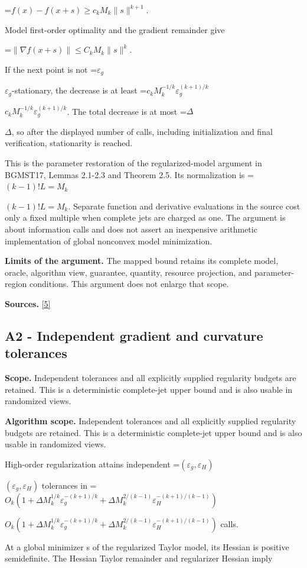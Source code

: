 \documentclass[10pt,a4paper]{article}
\newcommand{\AtlasMath}[1]{\par\begingroup\centering\setbox0=\hbox{$\displaystyle #1$}\ifdim\wd0>1.4\linewidth\typeout{ATLAS WIDE FORMULA: \the\wd0}\fi\ifdim\wd0>\linewidth\resizebox{\linewidth}{!}{\box0}\else\box0\fi\par\endgroup}
\newcommand{\AtlasInlineMath}[1]{\begingroup\setbox0=\hbox{$#1$}\ifdim\wd0>.4\linewidth\endgroup\AtlasMath{#1}\else\endgroup$#1$\fi}
\begin{document}
\AtlasMath{f(x)-f(x+s)\ge c_kM_k\|s\|^{k+1}.}

Model first-order optimality and the gradient remainder give

\AtlasMath{\|\nabla f(x+s)\|\le C_kM_k\|s\|^k.}

If the next point is not \AtlasInlineMath{\varepsilon_g}-stationary, the decrease is at least \AtlasInlineMath{c_kM_k^{-1/k}\varepsilon_g^{(k+1)/k}}. The total decrease is at most \AtlasInlineMath{\Delta}, so after the displayed number of calls, including initialization and final verification, stationarity is reached.

This is the parameter restoration of the regularized-model argument in BGMST17, Lemmas 2.1-2.3 and Theorem 2.5. Its normalization is \AtlasInlineMath{(k-1)!L=M_k}. Separate function and derivative evaluations in the source cost only a fixed multiple when complete jets are charged as one. The argument is about information calls and does not assert an inexpensive arithmetic implementation of global nonconvex model minimization.

\textbf{Limits of the argument.} The mapped bound retains its complete model, oracle, algorithm view, guarantee, quantity, resource projection, and parameter-region conditions. This argument does not enlarge that scope.

\textbf{Sources.} \href{https://optimization-online.org/wp-content/uploads/2015/06/4970.pdf}{[5]}

\subsection{A2 - Independent gradient and curvature tolerances}
\textbf{Scope.} Independent tolerances and all explicitly supplied regularity budgets are retained. This is a deterministic complete-jet upper bound and is also usable in randomized views.

\textbf{Algorithm scope.} Independent tolerances and all explicitly supplied regularity budgets are retained. This is a deterministic complete-jet upper bound and is also usable in randomized views.

High-order regularization attains independent \AtlasInlineMath{(\varepsilon_g,\varepsilon_H)} tolerances in \AtlasInlineMath{O_k(1+\Delta M_k^{1/k}\varepsilon_g^{-(k+1)/k}+\Delta M_k^{2/(k-1)}\varepsilon_H^{-(k+1)/(k-1)})} calls.

At a global minimizer s of the regularized Taylor model, its Hessian is positive semidefinite. The Hessian Taylor remainder and regularizer Hessian imply
\end{document}
